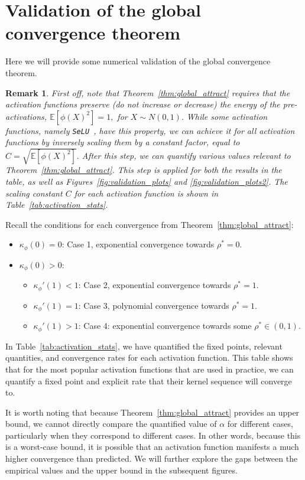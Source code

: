 \documentclass[twoside]{article}
\newcommand{\km}{\kappa_\phi}
\newtheorem{remark}{Remark}
\theoremstyle{definition}
\begin{document}
\section{Validation of the global convergence theorem}\label{sec:experiments}
Here we will provide some numerical validation of the global convergence theorem. 

\begin{remark}\label{rem:act-normalization}
    First off, note that Theorem~\ref{thm:global_attract} requires that the activation functions preserve (do not increase or decrease) the energy of the pre-activations, $\mathbb{E}[\phi(X)^2] = 1,$ for $X\sim N(0,1).$ While some activation functions, namely \texttt{SeLU}~\cite{klambauer2017self}, have this property, we can achieve it for all activation functions by inversely scaling them by a constant factor, equal to $C = \sqrt{\mathbb{E}[\phi(X)^2]}.$ After this step, we can quantify various values relevant to Theorem~\ref{thm:global_attract}. This step is applied for both the results in the table, as well as Figures~\ref{fig:validation_plots} and \ref{fig:validation_plots2}. The scaling constant $C$ for each activation function is shown in Table~\ref{tab:activation_stats}.
\end{remark}

Recall the conditions for each convergence from Theorem~\ref{thm:global_attract}:
\begin{itemize}
    \item $\km(0)=0$: Case 1, exponential convergence towards $\rho^*=0.$
    \item $\km(0)>0$:
    \begin{itemize}
        \item $\km'(1)<1$: Case 2, exponential convergence towards $\rho^*=1.$
        \item $\km'(1)=1$: Case 3, polynomial convergence towards $\rho^*=1.$
        \item $\km'(1)>1$: Case 4: exponential convergence towards some $\rho^*\in (0,1).$
    \end{itemize}
\end{itemize}
In Table~\ref{tab:activation_stats}, we have quantified the fixed points, relevant quantities, and convergence rates for each activation function. This table shows that for the most popular activation functions that are used in practice, we can quantify a fixed point and explicit rate that their kernel sequence will converge to. 

It is worth noting that because Theorem~\ref{thm:global_attract} provides an upper bound, we cannot directly compare the quantified value of $\alpha$ for different cases, particularly when they correspond to different cases. In other words, because this is a worst-case bound, it is possible that an activation function manifests a much higher convergence than predicted. We will further explore the gaps between the empirical values and the upper bound in the subsequent figures. 
\end{document}
